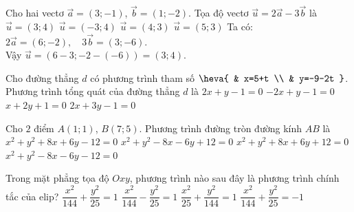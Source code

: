 \begin{ex}%
Cho hai vectơ $\overrightarrow{a} = (3; -1)$, $\overrightarrow{b} = (1; -2)$. Tọa độ vectơ $\overrightarrow{u} = 2\overrightarrow{a} - 3\overrightarrow{b}$ là
\choice
{\True $\overrightarrow{u} = (3; 4)$}
{$\overrightarrow{u} = (-3; 4)$}
{$\overrightarrow{u} = (4; 3)$}
{$\overrightarrow{u} = (5; 3)$}
\loigiai
{
Ta có:
$2\overrightarrow{a} = (6; -2), \quad 3\overrightarrow{b} = (3; -6)$.\\
Vậy $\overrightarrow{u} = (6 - 3; -2 - (-6)) = (3; 4)$.
}
\end{ex}

\begin{ex}%
Cho đường thẳng $d$ có phương trình tham số $\heva{
& x=5+t \\
& y=-9-2t
}$. Phương trình tổng quát của đường thẳng $d$ là
\choice
{\True $2x+y-1=0$}
{$-2x+y-1=0$}
{$x+2y+1=0$}
{$2x+3y-1=0$}
\end{ex}

\begin{ex}%
Cho $2$ điểm $A(1;1)$, $B(7;5)$. Phương trình đường tròn đường kính $AB$ là
\choice
{$x^2+y^2+8x+6y-12=0$}
{\True $x^2+y^2-8x-6y+12=0$}
{$x^2+y^2+8x+6y+12=0$}
{$x^2+y^2-8x-6y-12=0$}
\end{ex}

\begin{ex}%
Trong mặt phẳng tọa độ $O x y$, phương trình nào sau đây là phương trình chính tắc của elip?
\choice
{\True $\dfrac{x^2}{144}+\dfrac {y^2}{25}=1$}
{$\dfrac{x^2}{144}-\dfrac {y^2}{25}=1$}
{$\dfrac{x^2}{25}+\dfrac {y^2}{144}=1$}
{$\dfrac{x^2}{144}+\dfrac {y^2}{25}=-1$}
\end{ex}

